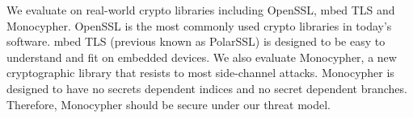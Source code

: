 \begin{table}[h]
\begin{tabular}{llrrrrrrr}
    \end{tabular}
\end{table}

We evaluate \tool{} on real-world crypto libraries including OpenSSL, mbed TLS and Monocypher\@. 
OpenSSL is the most commonly used crypto libraries in today's software. mbed TLS\@
(previous known as PolarSSL) is designed to be easy to understand and fit on
embedded devices. We also evaluate Monocypher, a new cryptographic library that
resists to most side-channel attacks. 
Monocypher is designed to have no 
secrets dependent indices and no secret dependent branches. Therefore,
Monocypher should be secure under our threat model.


